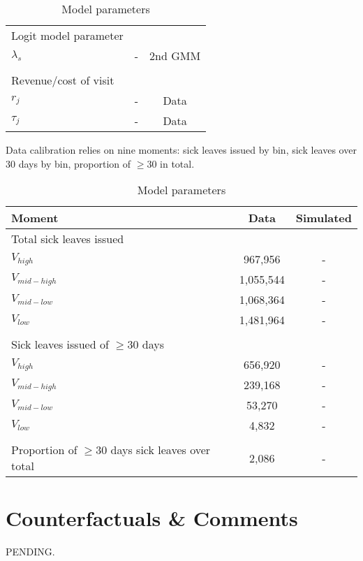 \documentclass[11pt]{article}
\begin{document}
\begin{table}[h]
\begin{tabular}{lcc}
        \\
    Logit model parameter && \\
        \hspace{1em}$\lambda_s$ & - & 2nd GMM\\
        \\
    Revenue/cost of visit && \\
        \hspace{1em}$r_j$ & - & Data \\
        \hspace{1em}$\tau_j$ & - & Data \\
    \bottomrule 
\end{tabular}
\caption{Model parameters}
\end{table}

Data calibration relies on nine moments: sick leaves issued by bin, sick leaves over 30 days by bin, proportion of $\geq30$ in total.

\begin{table}[h]
    \centering
    \begin{tabular}{lcc}
        \toprule
        Moment & Data & Simulated \\
        \midrule
        Total sick leaves issued && \\
            \hspace{1em}$V_{high}$ & 967,956 & -  \\
            \hspace{1em}$V_{mid-high}$& 1,055,544 & - \\
            \hspace{1em}$V_{mid-low}$& 1,068,364& -  \\
            \hspace{1em}$V_{low}$ &  1,481,964& -\\
            \\
        Sick leaves issued of $\geq 30$ days && \\
            \hspace{1em}$V_{high}$& 656,920 & -  \\
            \hspace{1em}$V_{mid-high}$& 239,168 & - \\
            \hspace{1em}$V_{mid-low}$& 53,270& -  \\
            \hspace{1em}$V_{low}$ & 4,832 & -\\
            \\
        Proportion of $\geq 30$ days sick leaves over total & 2,086& - \\
        \bottomrule 
    \end{tabular}
    \caption{Model parameters}
    \end{table}

\section{Counterfactuals \& Comments}

PENDING.

\newpage





\newpage


\end{document}
